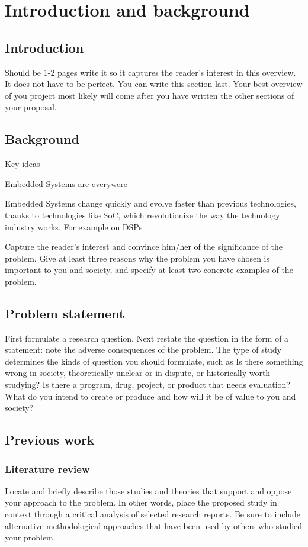 \chapter{Introduction and background}

\section{Introduction}
Should be 1-2 pages
write it so it captures the reader's interest in this overview. It does not have to be perfect.
You can write this section last. Your best overview of you project most likely will come after you have written the other sections of your proposal.

\section{Background}
Key ideas

Embedded Systems are everywere

Embedded Systems change quickly and evolve faster than previous technologies, thanks to technologies like \ac{SoC}, which revolutionize the way the technology industry works\cite{Somaya:2000fk}. For example on \acp{DSP}

Capture the reader's interest and convince him/her of the significance of the problem.
Give at least three reasons why the problem you have chosen is important to you and society, and specify at least two concrete examples of the problem.

\section{Problem statement}
First formulate a research question. Next restate the question in the form of a statement: note the adverse consequences of the problem.
The type of study determines the kinds of question you should formulate, such as Is there something wrong in society, theoretically unclear or in dispute, or historically worth studying? Is there a program, drug, project, or product that needs evaluation? What do you intend to create or produce and how will it be of value to you and society?

\section{Previous work}

\subsection{Literature review}
Locate and briefly describe those studies and theories that support and oppose your approach to the problem. In other words, place the proposed study in context through a critical analysis of selected research reports.
Be sure to include alternative methodological approaches that have been used by others who studied your problem.

